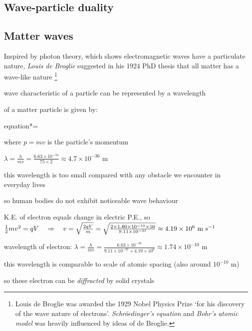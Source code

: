 \subsection{Wave-particle duality}



\subsection{Matter waves}

Inspired by photon theory, which shows electromagnetic waves have a particulate nature, \emph{Louis de Broglie} suggested in his 1924 PhD thesis that all matter has a wave-like nature
\footnote{Louis de Broglie was awarded the 1929 Nobel Physics Prize `for his discovery of the wave nature of electrons'. \emph{Schr\"oedinger's equation} and \emph{Bohr's atomic model} was heavily influenced by ideas of de Broglie.}

wave characteristic of a particle can be represented by a wavelength

\begin{ilight}
	 of a matter particle is given by:\begin{empheq}[box=\tcbhighmath]{equation*}{\lambda = }\end{empheq} where $p=mv$ is the particle's momentum
\end{ilight}


\begin{soln}
    $\lambda = \frac{h}{mv} = \frac{6.63\times10^{-34}}{75\times 2} \approx 4.7\times 10^{-36} \text{ m}$

this wavelength is too small compared with any obstacle we encounter in everyday lives

so human bodies do not exhibit noticeable wave behaviour \end{soln} 

\begin{soln}
K.E. of electron equals change in electric P.E., so
$\frac{1}{2}mv^2 = qV \quad \Rightarrow \quad v = \sqrt{\frac{2qV}{m}} = \sqrt{\frac{2\times1.60\times 10^{-19} \times 50}{9.11\times10^{-31}}} \approx 4.19\times10^6 \text{ m s$^{-1}$}$


wavelength of electron: $\lambda = \frac{h}{mv} = \frac{6.63\times10^{-34}}{9.11\times10^{-31}\times 4.19\times10^6} \approx 1.74 \times10^{-10} \text{ m}$

this wavelength is comparable to scale of atomic spacing (also around $10^{-10}\text{ m}$)

so these electron can be \emph{diffracted} by solid crystals\end{soln}

